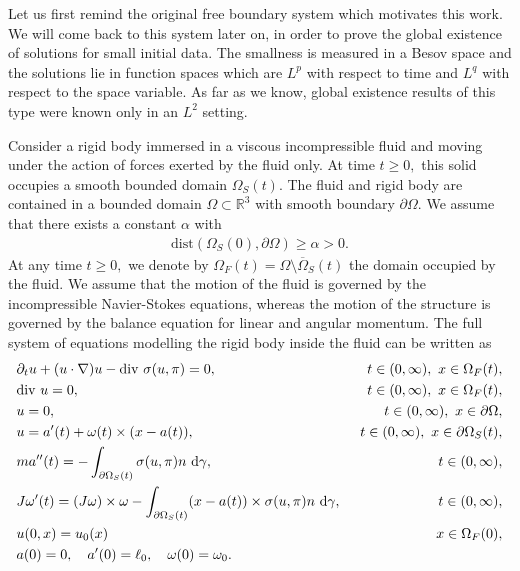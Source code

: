 \documentclass[12pt,a4paper,reqno]{amsart}
\theoremstyle{definition}
\theoremstyle{remark}
\numberwithin{equation}{section}
\newcommand{\ost}{\Omega_{S}(t)}
\newcommand{\oso}{\Omega_{S}(0)}
\newcommand{\oft}{\Omega_{F}(t)}
\newcommand{\rt}{\mathbb{R}^{3}}
\newcommand{\post}{\partial \ost}
\newcommand{\dg}{{\rm d} \gamma}
\begin{document}
Let us first remind the original free boundary system which motivates this work. We will come back to this system later on, in order to prove the global existence of solutions for small initial data. The smallness is measured in a Besov space and the solutions lie in function spaces which are $L^{p}$ with respect to time and $L^{q}$ with respect to the space variable. As far as we know, global existence results of this type were known only in an $L^2$ setting.

Consider a rigid body immersed in a viscous incompressible fluid and moving under the action of forces exerted by the fluid only.  At time $t \geqslant 0,$ this solid occupies a smooth bounded domain $\Omega_{S}(t).$ The fluid and rigid body are contained in a bounded domain $\Omega \subset \rt$ with smooth boundary $\partial \Omega.$ We assume that there exists a constant $\alpha$ with
\begin{align} \label{eq:ini-d}
\mathrm{dist} \left(\oso,\partial\Omega\right) \geqslant \alpha > 0.
\end{align}
 At any time  $t \geqslant 0,$ we denote by  $\Omega_{F}(t) = \Omega \setminus \overline \ost$ the  domain occupied by the fluid. We assume that the motion of the fluid is governed by the incompressible Navier-Stokes equations, whereas the motion of the structure is governed by the balance equation for linear and angular momentum.  The full system of equations modelling the rigid body inside  the fluid can be written as
 \begin{alignat}{2} \label{eq:mainsys}
& \partial_{t} u + ( u \cdot \nabla) u - \mathrm{div} \ \sigma(u,\pi) = 0, &  \quad t \in (0,\infty), \  x\in \oft, \notag \\
& \mathrm{div} \ u =0,  &  \quad t \in (0,\infty), \  x\in \oft, \notag  \\
&  u = 0, & \quad t \in (0,\infty), \  x\in \partial\Omega, \notag  \\
& u = a'(t) + \omega(t) \times (x - a(t)), & t \in (0,\infty), \  x\in \partial\ost, \\
& m a''(t) = -\int_{\post} \sigma(u,\pi) n \ {\rm d} \gamma, & t \in (0,\infty), \notag\\
& J \omega'(t)  = (J\omega) \times \omega - \int_{\post} (x- a(t)) \times \sigma(u,\pi)n  \ \dg, & t \in (0,\infty), \notag \\
& u(0,x) = u_{0}(x) & x \in \Omega_{F}(0), \notag \\
& a(0) = 0, \quad a'(0) = \ell_{0}, \quad \omega(0) = \omega_{0}.  \notag
 \end{alignat}
\end{document}
